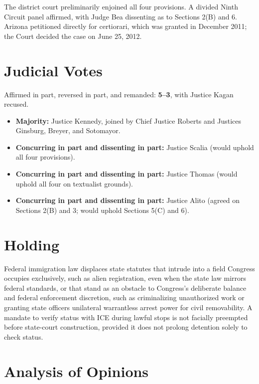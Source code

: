 \documentclass[12pt]{article}
\begin{document}
The district court preliminarily enjoined all four provisions. A divided Ninth Circuit panel affirmed, with Judge Bea dissenting as to Sections 2(B) and 6. Arizona petitioned directly for certiorari, which was granted in December 2011; the Court decided the case on June 25, 2012.

\section{Judicial Votes}

Affirmed in part, reversed in part, and remanded: \textbf{5--3}, with Justice Kagan recused.
\begin{itemize}
\item \textbf{Majority:} Justice Kennedy, joined by Chief Justice Roberts and Justices Ginsburg, Breyer, and Sotomayor.
\item \textbf{Concurring in part and dissenting in part:} Justice Scalia (would uphold all four provisions).
\item \textbf{Concurring in part and dissenting in part:} Justice Thomas (would uphold all four on textualist grounds).
\item \textbf{Concurring in part and dissenting in part:} Justice Alito (agreed on Sections 2(B) and 3; would uphold Sections 5(C) and 6).
\end{itemize}

\section{Holding}

Federal immigration law displaces state statutes that intrude into a field Congress occupies exclusively, such as alien registration, even when the state law mirrors federal standards, or that stand as an obstacle to Congress's deliberate balance and federal enforcement discretion, such as criminalizing unauthorized work or granting state officers unilateral warrantless arrest power for civil removability. A mandate to verify status with ICE during lawful stops is not facially preempted before state-court construction, provided it does not prolong detention solely to check status.

\section{Analysis of Opinions}
\end{document}
